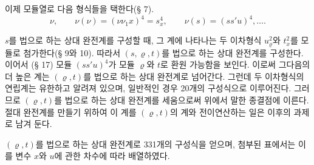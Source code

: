 
이제 모듈열로 다음 형식들을 택한다(§ 7).
\[
\nu,\qquad \nu(\nu)=(\nu\nu_1x)^4=s_x^4,\qquad \nu(s)=(ss'u)^4,\ldots .
\]

$s$를 법으로 하는 상대 완전계를 구성할 때, 그 계에 나타나는 두 이차형식 $u_\varrho^2$와 $t_x^2$를 모듈로 첨가한다(§ 9와 10). 따라서 $(s,\varrho,t)$를 법으로 하는 상대 완전계를 구성한다. 이어서 (§ 17) 모듈 $(ss'u)^4$가 모듈 $\varrho$와 $t$로 환원 가능함을 보인다. 이로써 그다음의 더 높은 계는 $(\varrho,t)$를 법으로 하는 상대 완전계로 넘어간다. 그런데 두 이차형식의 연립계는 유한하고 알려져 있으며, 일반적인 경우 20개의 구성식으로 이루어진다. 그러므로 $(\varrho,t)$를 법으로 하는 상대 완전계를 세움으로써 위에서 말한 종결점에 이른다. 절대 완전계를 만들기 위하여 이 계를 $(\varrho,t)$의 계와 전이연산하는 일은 이후의 과제로 남겨 둔다.

$(\varrho,t)$를 법으로 하는 상대 완전계로 331개의 구성식을 얻으며, 첨부된 표에서는 이를 변수 $x$와 $u$에 관한 차수에 따라 배열하였다.

